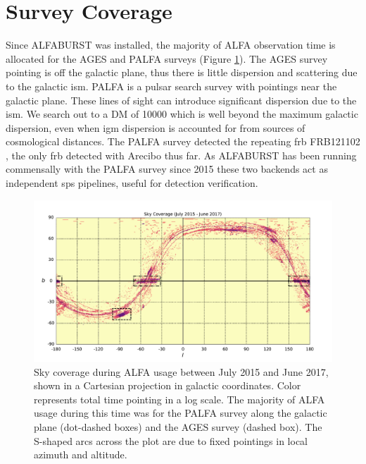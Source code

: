 \documentclass[a4paper,fleqn,usenatbib]{mnras}
\begin{document}



\section{Survey Coverage}
\label{sec:survey_coverage}

Since ALFABURST was installed, the majority of ALFA observation time is
allocated for the AGES \citep{2006MNRAS.371.1617A} and PALFA
\citep{2006ApJ...637..446C} surveys (Figure \ref{fig:sky_coverage}).  The AGES
survey pointing is off the galactic plane, thus there is little dispersion and
scattering due to the galactic \gls*{ism}. PALFA is a pulsar search survey with
pointings near the galactic plane. These lines of sight can introduce
significant dispersion due to the \gls*{ism}. We search out to a DM of 10000
which is well beyond the maximum galactic dispersion, even when \gls*{igm}
dispersion is accounted for from sources of cosmological distances. The PALFA
survey detected the repeating \gls{frb} FRB121102 \citep{2014ApJ...790..101S},
the only \gls{frb} detected with Arecibo thus far. As ALFABURST has been running
commensally with the PALFA survey since 2015 these two backends act as
independent \gls{sps} pipelines, useful for detection verification.

\begin{figure}
    \includegraphics[width=1.0\linewidth]{figures/cartview_sky_coverage.pdf}
    \caption{Sky coverage during ALFA usage between July 2015 and June 2017,
    shown in a Cartesian projection in galactic coordinates. Color represents
    total time pointing in a log scale. The majority of ALFA usage during this
    time was for the PALFA survey along the galactic plane (dot-dashed boxes)
    and the AGES survey (dashed box).  The S-shaped arcs across the plot are due
    to fixed pointings in local azimuth and altitude.
    }
    \label{fig:sky_coverage}
\end{figure}
\end{document}
